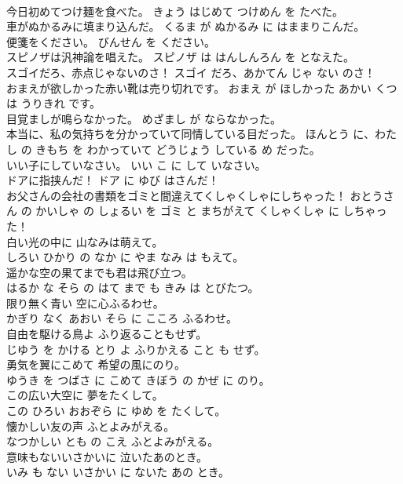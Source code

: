 \documentclass[8pt]{extreport}
\begin{document}
\begin{CJK}{UTF8}{min}
\\	今日初めてつけ麺を食べた。	きょう はじめて つけめん を たべた。	
\\	車がぬかるみに填まり込んだ。	くるま が ぬかるみ に はままりこんだ。	
\\	便箋をください。	びんせん を ください。	
\\	スピノザは汎神論を唱えた。	スピノザ は はんしんろん を となえた。	
\\	スゴイだろ、赤点じゃないのさ！	スゴイ だろ、あかてん じゃ ない のさ！	
\\	おまえが欲しかった赤い靴は売り切れです。	おまえ が ほしかった あかい くつ は うりきれ です。	
\\	目覚ましが鳴らなかった。	めざまし が ならなかった。	
\\	本当に、私の気持ちを分かっていて同情している目だった。	ほんとう に、わたし の きもち を わかっていて どうじょう している め だった。	
\\	いい子にしていなさい。	いい こ に して いなさい。	
\\	ドアに指挟んだ！	ドア に ゆび はさんだ！	
\\	お父さんの会社の書類をゴミと間違えてくしゃくしゃにしちゃった！	おとうさん の かいしゃ の しょるい を ゴミ と まちがえて くしゃくしゃ に しちゃった！	
\\	白い光の中に 山なみは萌えて。	
\\	しろい ひかり の なか に やま なみ は もえて。	
\\	遥かな空の果てまでも君は飛び立つ。	
\\	はるか な そら の はて まで も きみ は とびたつ。	
\\	限り無く青い 空に心ふるわせ。	
\\	かぎり なく あおい そら に こころ ふるわせ。	
\\	自由を駆ける鳥よ ふり返ることもせず。	
\\	じゆう を かける とり よ ふりかえる こと も せず。	
\\	勇気を翼にこめて 希望の風にのり。	
\\	ゆうき を つばさ に こめて きぼう の かぜ に のり。	
\\	この広い大空に 夢をたくして。	
\\	この ひろい おおぞら に ゆめ を たくして。	
\\	懐かしい友の声 ふとよみがえる。	
\\	なつかしい とも の こえ ふとよみがえる。	
\\	意味もないいさかいに 泣いたあのとき。	
\\	いみ も ない いさかい に ないた あの とき。	

\end{CJK}
\end{document}
